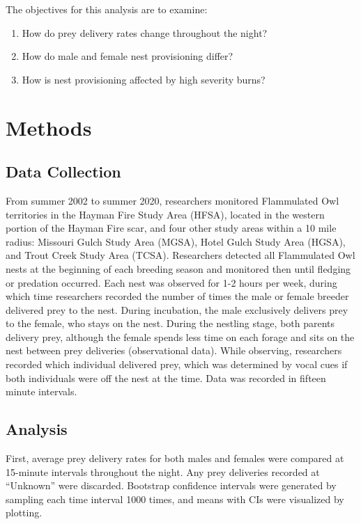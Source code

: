 \documentclass[
]{article}
\providecommand{\tightlist}{%
  \setlength{\itemsep}{0pt}\setlength{\parskip}{0pt}}
\begin{document}
The objectives for this analysis are to examine:

\begin{enumerate}
\def\labelenumi{\arabic{enumi}.}
\tightlist
\item
  How do prey delivery rates change throughout the night?
\item
  How do male and female nest provisioning differ?
\item
  How is nest provisioning affected by high severity burns?
\end{enumerate}

\hypertarget{methods}{%
\section{Methods}\label{methods}}

\hypertarget{data-collection}{%
\subsection{Data Collection}\label{data-collection}}

From summer 2002 to summer 2020, researchers monitored Flammulated Owl
territories in the Hayman Fire Study Area (HFSA), located in the western
portion of the Hayman Fire scar, and four other study areas within a 10
mile radius: Missouri Gulch Study Area (MGSA), Hotel Gulch Study Area
(HGSA), and Trout Creek Study Area (TCSA). Researchers detected all
Flammulated Owl nests at the beginning of each breeding season and
monitored then until fledging or predation occurred. Each nest was
observed for 1-2 hours per week, during which time researchers recorded
the number of times the male or female breeder delivered prey to the
nest. During incubation, the male exclusively delivers prey to the
female, who stays on the nest. During the nestling stage, both parents
delivery prey, although the female spends less time on each forage and
sits on the nest between prey deliveries (observational data). While
observing, researchers recorded which individual delivered prey, which
was determined by vocal cues if both individuals were off the nest at
the time. Data was recorded in fifteen minute intervals.

\hypertarget{analysis}{%
\subsection{Analysis}\label{analysis}}

First, average prey delivery rates for both males and females were
compared at 15-minute intervals throughout the night. Any prey
deliveries recorded at ``Unknown'' were discarded. Bootstrap confidence
intervals were generated by sampling each time interval 1000 times, and
means with CIs were visualized by plotting.
\end{document}

